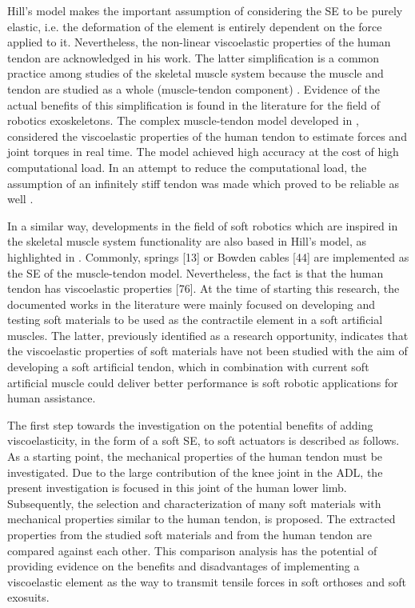 Hill's model makes the important assumption of considering the SE to be purely elastic, i.e. the deformation of the element is entirely dependent on the force applied to it. Nevertheless, the non-linear viscoelastic properties of the human tendon are acknowledged in his work. The latter simplification is a common practice among studies of the skeletal muscle system because the muscle and tendon are studied as a whole (muscle-tendon component) \cite{zajac1989muscle}. Evidence of the actual benefits of this simplification is found in the literature for the field of robotics exoskeletons. The complex muscle-tendon model developed in \cite{lloyd2003emg}, considered the viscoelastic properties of the human tendon to estimate forces and joint torques in real time. The model achieved high accuracy at the cost of high computational load. In an attempt to reduce the computational load, the assumption of an infinitely stiff tendon was made which proved to be reliable as well \cite{sartori2009stiff}.

In a similar way, developments in the field of soft robotics which are inspired in the skeletal muscle system functionality are also based in Hill's model, as highlighted in . Commonly, springs [13] or Bowden cables [44] are implemented as the SE of the muscle-tendon model. Nevertheless, the fact is that the human tendon has viscoelastic properties [76]. At the time of starting this research, the documented works in the literature were mainly focused on developing and testing soft materials to be used as the contractile element in a soft artificial muscles. The latter, previously identified as a research opportunity, indicates that the viscoelastic properties of soft materials have not been studied with the aim of developing a soft artificial tendon, which in combination with current soft artificial muscle could deliver better performance is soft robotic applications for human assistance.

The first step towards the investigation on the potential benefits of adding viscoelasticity, in the form of a soft SE, to soft actuators is described as follows. As a starting point, the mechanical properties of the human tendon must be investigated. Due to the large contribution of the knee joint in the ADL, the present investigation is focused in this joint of the human lower limb. Subsequently, the selection and characterization of many soft materials with mechanical properties similar to the human tendon, is proposed. The extracted properties from the studied soft materials and from the human tendon are compared against each other. This comparison analysis has the potential of providing evidence on the benefits and disadvantages of implementing a viscoelastic element as the way to transmit tensile forces in soft orthoses and soft exosuits.


